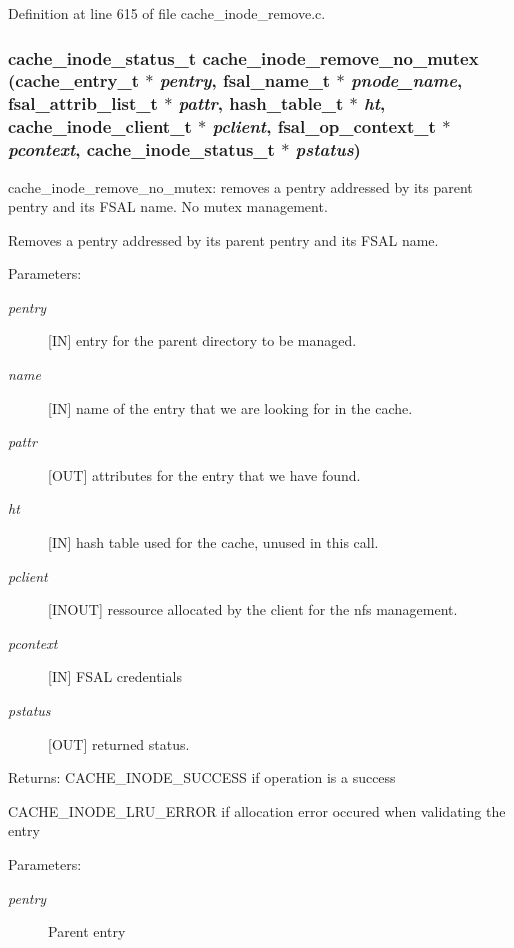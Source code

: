 Definition at line 615 of file cache\_\-inode\_\-remove.c.
\subsubsection[{cache\_\-inode\_\-remove\_\-no\_\-mutex}]{\setlength{\rightskip}{0pt plus 5cm}cache\_\-inode\_\-status\_\-t cache\_\-inode\_\-remove\_\-no\_\-mutex (cache\_\-entry\_\-t $\ast$ {\em pentry}, \/  fsal\_\-name\_\-t $\ast$ {\em pnode\_\-name}, \/  fsal\_\-attrib\_\-list\_\-t $\ast$ {\em pattr}, \/  hash\_\-table\_\-t $\ast$ {\em ht}, \/  cache\_\-inode\_\-client\_\-t $\ast$ {\em pclient}, \/  fsal\_\-op\_\-context\_\-t $\ast$ {\em pcontext}, \/  cache\_\-inode\_\-status\_\-t $\ast$ {\em pstatus})}\label{cache__inode__remove_8c_bc88903c5c3036d83b9a289b40e871b0}


cache\_\-inode\_\-remove\_\-no\_\-mutex: removes a pentry addressed by its parent pentry and its FSAL name. No mutex management.

Removes a pentry addressed by its parent pentry and its FSAL name.

\begin{Desc}
\item[Parameters:]
\begin{description}
\item[{\em pentry}][IN] entry for the parent directory to be managed. \item[{\em name}][IN] name of the entry that we are looking for in the cache. \item[{\em pattr}][OUT] attributes for the entry that we have found. \item[{\em ht}][IN] hash table used for the cache, unused in this call. \item[{\em pclient}][INOUT] ressource allocated by the client for the nfs management. \item[{\em pcontext}][IN] FSAL credentials \item[{\em pstatus}][OUT] returned status.\end{description}
\end{Desc}
\begin{Desc}
\item[Returns:]CACHE\_\-INODE\_\-SUCCESS if operation is a success \par
 

CACHE\_\-INODE\_\-LRU\_\-ERROR if allocation error occured when validating the entry \end{Desc}
\begin{Desc}
\item[Parameters: ]\par
\begin{description}
\item[{\em 
pentry}]Parent entry \end{description}
\end{Desc}


